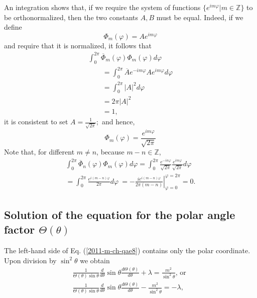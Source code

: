 An integration shows that, if we require the system of functions $\{e^{im\varphi}\vert m \in \mathbb{Z}\}$
to be orthonormalized, then the two constants $A,B$ must be equal.
Indeed, if we define
\begin{equation}
\Phi_m(\varphi) = Ae^{im\varphi}
\label{2011-m-ch-qae11def}
\end{equation}
and require that it is normalized, it follows that
\begin{equation}
\begin{split}
\int_0^{2\pi} \overline {\Phi}_m(\varphi) \Phi_m(\varphi)d \varphi \\
\qquad     =
\int_0^{2\pi} \overline {A}e^{-im\varphi}Ae^{im\varphi} d \varphi \\
\qquad    =
\int_0^{2\pi}\vert A\vert^2 d \varphi \\
\qquad  = 2\pi  \vert A\vert^2  \\
\qquad
= 1,
\end{split}
\label{2011-m-ch-qae11normexpl}
\end{equation}
it is consistent to set
$
A= \frac{1} {\sqrt{2\pi } };
$
and hence,
\begin{equation}
\Phi_m(\varphi) = \frac{e^{im\varphi}} {\sqrt{2\pi }  }
\label{2011-m-ch-qae11normexplnendg}
\end{equation}
Note that, for different $m\neq n$, because $m-n\in \mathbb{Z}$,
\begin{equation}
\begin{split}
\int_0^{2\pi} \overline {\Phi}_n(\varphi) \Phi_m(\varphi)d \varphi
  =
\int_0^{2\pi} \frac{e^{-in\varphi}} {\sqrt{2\pi }  } \frac{e^{im\varphi}} {\sqrt{2\pi }}  d \varphi \\
  =
\int_0^{2\pi} \frac{e^{i(m-n)\varphi}} { 2\pi  }   d \varphi \
  =
\left. -\frac{i e^{i(m-n)\varphi}} { 2\pi (m-n) } \right|_{\varphi =0}^{\varphi = 2\pi}  = 0
.
\end{split}
\label{2011-m-ch-qae11normexplnoni}
\end{equation}


\subsection{Solution of the equation  for the  polar angle factor $\Theta (\theta )$}

The left-hand side of
Eq. (\ref{2011-m-ch-qae8}) contains only the polar coordinate.
Upon division by $\sin ^2 \theta$ we obtain
\begin{equation}
\begin{split}
\frac{1}{\Theta(\theta)\sin \theta}
\frac{   d   }{   d    \theta }
\sin \theta \frac{   d    \Theta(\theta)}{   d    \theta }
+  \lambda
= \frac{m^2}{\sin^2\theta}\textrm{, or }\\
\frac{1}{\Theta(\theta)\sin \theta}
\frac{   d   }{   d    \theta }
\sin \theta \frac{   d    \Theta(\theta)}{   d    \theta }   -\frac{m^2}{\sin^2\theta }
= -  \lambda    ,\\
\end{split}
\label{2011-m-ch-pcde}
\end{equation}

